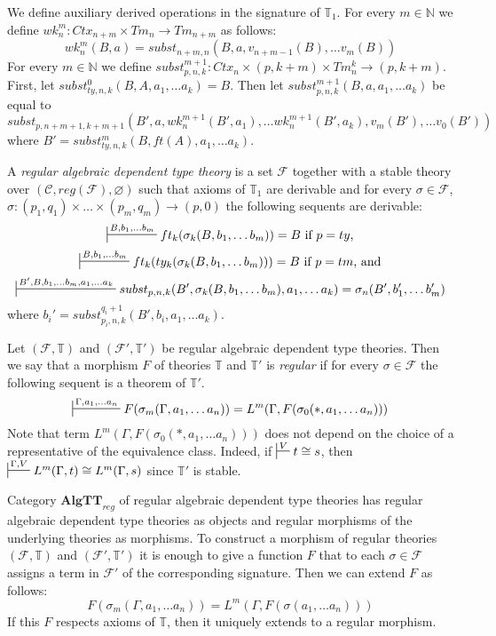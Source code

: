 \documentclass[reqno]{amsart}
\theoremstyle{definition}
\theoremstyle{remark}
\newcommand{\cat}[1]{\mathbf{#1}}
\newcommand{\algtt}{\cat{AlgTT}}
\numberwithin{figure}{section}
\begin{document}
We define auxiliary derived operations in the signature of $\mathbb{T}_1$.
For every $m \in \mathbb{N}$ we define $wk^m_n : Ctx_{n+m} \times Tm_n \to Tm_{n+m}$ as follows:
\[ wk^m_n(B,a) = subst_{n+m,n}(B, a, v_{n+m-1}(B), \ldots v_m(B)) \]
For every $m \in \mathbb{N}$ we define $subst^{m+1}_{p,n,k} : Ctx_n \times (p,k+m) \times Tm^k_n \to (p,k+m)$.
First, let $subst^0_{ty,n,k}(B, A, a_1, \ldots a_k) = B$.
Then let $subst^{m+1}_{p,n,k}(B, a, a_1, \ldots a_k)$ be equal to
\[ subst_{p,n+m+1,k+m+1}(B', a, wk^{m+1}_n(B', a_1), \ldots wk^{m+1}_n(B', a_k), v_m(B'), \ldots v_0(B')) \]
where $B' = subst^m_{ty,n,k}(B, ft(A), a_1, \ldots a_k)$.

\begin{defn}
A \emph{regular algebraic dependent type theory} is a set $\mathcal{F}$ together with a stable theory over $(\mathcal{C}, reg(\mathcal{F}), \varnothing)$
such that axioms of $\mathbb{T}_1$ are derivable and for every $\sigma \in \mathcal{F}$, $\sigma : (p_1,q_1) \times \ldots \times (p_m,q_m) \to (p,0)$ the following sequents are derivable:
\[ \sststile{}{B, b_1, \ldots b_m} ft_k(\sigma_k(B, b_1, \ldots b_m)) = B \text{ if $p = ty$,} \]
\[ \sststile{}{B, b_1, \ldots b_m} ft_k(ty_k(\sigma_k(B, b_1, \ldots b_m))) = B \text{ if $p = tm$, and} \]
\[ \sststile{}{B', B, b_1, \ldots b_m, a_1, \ldots a_k} subst_{p,n,k}(B', \sigma_k(B, b_1, \ldots b_m), a_1, \ldots a_k) = \sigma_n(B', b_1', \ldots b_m') \]
where $b_i' = subst_{p_i,n,k}^{q_i+1}(B', b_i, a_1, \ldots a_k)$.
\end{defn}

Let $(\mathcal{F},\mathbb{T})$ and $(\mathcal{F}',\mathbb{T}')$ be regular algebraic dependent type theories.
Then we say that a morphism $F$ of theories $\mathbb{T}$ and $\mathbb{T}'$ is \emph{regular} if for every $\sigma \in \mathcal{F}$ the following sequent is a theorem of $\mathbb{T}'$.
\[ \sststile{}{\Gamma, a_1, \ldots a_n} F(\sigma_m(\Gamma, a_1, \ldots a_n)) = L^m(\Gamma, F(\sigma_0(*, a_1, \ldots a_n))) \]
Note that term $L^m(\Gamma, F(\sigma_0(*, a_1, \ldots a_n)))$ does not depend on the choice of a representative of the equivalence class.
Indeed, if $\sststile{}{V} t \cong s$, then $\sststile{}{\Gamma,V} L^m(\Gamma,t) \cong L^m(\Gamma,s)$ since $\mathbb{T}'$ is stable.

Category $\algtt_{reg}$ of regular algebraic dependent type theories has regular algebraic dependent type theories as objects and regular morphisms of the underlying theories as morphisms.
To construct a morphism of regular theories $(\mathcal{F},\mathbb{T})$ and $(\mathcal{F}',\mathbb{T}')$ it is enough to give a function $F$ that to each $\sigma \in \mathcal{F}$ assigns a term in $\mathcal{F}'$ of the corresponding signature.
Then we can extend $F$ as follows:
\[ F(\sigma_m(\Gamma, a_1, \ldots a_n)) = L^m(\Gamma, F(\sigma(a_1, \ldots a_n))) \]
If this $F$ respects axioms of $\mathbb{T}$, then it uniquely extends to a regular morphism.
\end{document}
